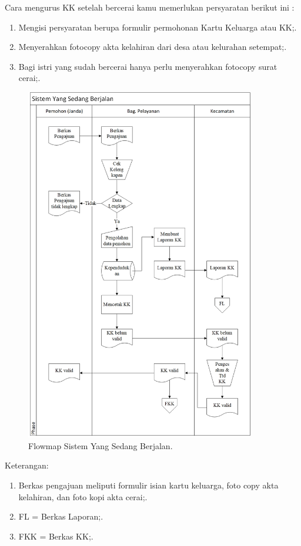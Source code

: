 Cara mengurus KK setelah bercerai kamu memerlukan persyaratan berikut ini :
\begin{enumerate}
	\item Mengisi persyaratan berupa formulir permohonan Kartu Keluarga atau KK;.
	\item Menyerahkan fotocopy akta kelahiran dari desa atau kelurahan setempat;.
	\item Bagi istri yang sudah bercerai hanya perlu menyerahkan fotocopy surat cerai;.
\end{enumerate}
	\begin{figure}[H]
		\centering
		\includegraphics[width=10cm]{figures/flowmap.jpg}
		\caption{Flowmap Sistem Yang Sedang Berjalan.}
	\end{figure}
Keterangan:
\begin{enumerate}
	\item Berkas pengajuan meliputi formulir isian kartu keluarga, foto copy akta kelahiran, dan foto kopi akta cerai;.
	\item FL = Berkas Laporan;.
	\item FKK = Berkas KK;.
\end{enumerate}
